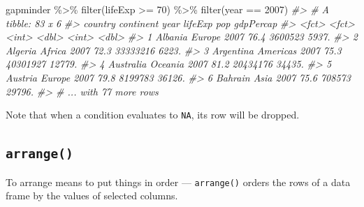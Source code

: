 \documentclass[
]{book}
\newenvironment{Shaded}{\begin{snugshade}}{\end{snugshade}}
\newcommand{\CommentTok}[1]{\textcolor[rgb]{0.56,0.35,0.01}{\textit{#1}}}
\newcommand{\DecValTok}[1]{\textcolor[rgb]{0.00,0.00,0.81}{#1}}
\newcommand{\FunctionTok}[1]{\textcolor[rgb]{0.00,0.00,0.00}{#1}}
\newcommand{\NormalTok}[1]{#1}
\newcommand{\SpecialCharTok}[1]{\textcolor[rgb]{0.00,0.00,0.00}{#1}}
\begin{document}
\begin{Shaded}
\begin{Highlighting}[]
\NormalTok{gapminder }\SpecialCharTok{\%\textgreater{}\%} \FunctionTok{filter}\NormalTok{(lifeExp }\SpecialCharTok{\textgreater{}=} \DecValTok{70}\NormalTok{) }\SpecialCharTok{\%\textgreater{}\%} \FunctionTok{filter}\NormalTok{(year }\SpecialCharTok{==} \DecValTok{2007}\NormalTok{)}
\CommentTok{\#\textgreater{} \# A tibble: 83 x 6}
\CommentTok{\#\textgreater{}   country   continent  year lifeExp      pop gdpPercap}
\CommentTok{\#\textgreater{}   \textless{}fct\textgreater{}     \textless{}fct\textgreater{}     \textless{}int\textgreater{}   \textless{}dbl\textgreater{}    \textless{}int\textgreater{}     \textless{}dbl\textgreater{}}
\CommentTok{\#\textgreater{} 1 Albania   Europe     2007    76.4  3600523     5937.}
\CommentTok{\#\textgreater{} 2 Algeria   Africa     2007    72.3 33333216     6223.}
\CommentTok{\#\textgreater{} 3 Argentina Americas   2007    75.3 40301927    12779.}
\CommentTok{\#\textgreater{} 4 Australia Oceania    2007    81.2 20434176    34435.}
\CommentTok{\#\textgreater{} 5 Austria   Europe     2007    79.8  8199783    36126.}
\CommentTok{\#\textgreater{} 6 Bahrain   Asia       2007    75.6   708573    29796.}
\CommentTok{\#\textgreater{} \# ... with 77 more rows}
\end{Highlighting}
\end{Shaded}

Note that when a condition evaluates to \texttt{NA}, its row will be dropped.

\hypertarget{arrange}{%
\subsection*{\texorpdfstring{\texttt{arrange()}}{arrange()}}\label{arrange}}

To arrange means to put things in order --- \texttt{arrange()} orders the rows of a data frame by the values of selected columns.
\end{document}
